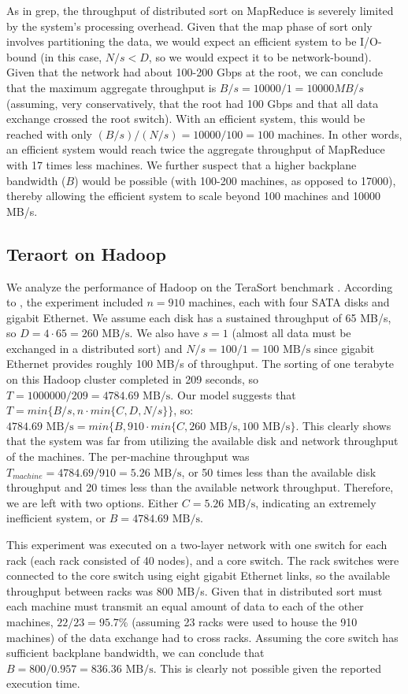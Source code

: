 \documentclass{acm_proc_article-sp}
\begin{document}
As in grep, the throughput of distributed sort on MapReduce is severely limited by the system's processing overhead. Given that the map phase of sort only involves partitioning the data, we would expect an efficient system to be I/O-bound (in this case, $N/s < D$, so we would expect it to be network-bound). Given that the network had about 100-200 Gbps at the root, we can conclude that the maximum aggregate throughput is $B/s = 10000/1 = 10000 MB/s$ (assuming, very conservatively, that the root had 100 Gbps and that all data exchange crossed the root switch). With an efficient system, this would be reached with only $(B/s) / (N/s) = 10000/100 = 100$ machines. In other words, an efficient system would reach twice the aggregate throughput of MapReduce with 17 times less machines. We further suspect that a higher backplane bandwidth ($B$) would be possible (with 100-200 machines, as opposed to 17000), thereby allowing the efficient system to scale beyond 100 machines and 10000 MB/s.

\subsection{Teraort on Hadoop}
We analyze the performance of Hadoop on the TeraSort benchmark \cite{terasort}. According to \cite{hadoopterasort}, the experiment included $n=910$ machines, each with four SATA disks and gigabit Ethernet. We assume each disk has a sustained throughput of 65 MB/s, so $D = 4 \cdot 65 = 260 \text{ MB/s}$. We also have $s = 1$ (almost all data must be exchanged in a distributed sort) and $N/s = 100/1 = 100 \text{ MB/s}$ since gigabit Ethernet provides roughly 100 MB/s of throughput. The sorting of one terabyte on this Hadoop cluster completed in 209 seconds, so $T = 1000000/209 = 4784.69 \text{ MB/s}$. Our model suggests that $T = min\{B/s, n \cdot min\{C, D, N/s\}\}$, so: $4784.69 \text{ MB/s} = min\{B, 910 \cdot min\{C, 260 \text{ MB/s}, 100 \text{ MB/s}\}$. This clearly shows that the system was far from utilizing the available disk and network throughput of the machines. The per-machine throughput was $T_{machine} = 4784.69/910 = 5.26 \text{ MB/s}$, or 50 times less than the available disk throughput and 20 times less than the available network throughput. Therefore, we are left with two options. Either $C = 5.26 \text{ MB/s}$, indicating an extremely inefficient system, or $B = 4784.69 \text{ MB/s}$.

This experiment was executed on a two-layer network with one switch for each rack (each rack consisted of 40 nodes), and a core switch. The rack switches were connected to the core switch using eight gigabit Ethernet links, so the available throughput between racks was 800 MB/s. Given that in distributed sort must each machine must transmit an equal amount of data to each of the other machines, $22/23 = 95.7\%$ (assuming 23 racks were used to house the 910 machines) of the data exchange had to cross racks. Assuming the core switch has sufficient backplane bandwidth, we can conclude that $B = 800/0.957 = 836.36 \text{ MB/s}$. This is clearly not possible given the reported execution time.
\end{document}
